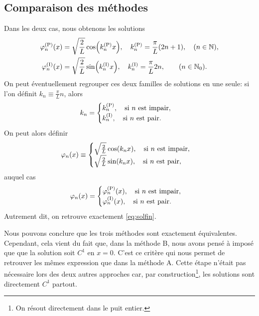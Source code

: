 \documentclass[11pt,a4paper,oneside]{article}
\begin{document}
\subsection{Comparaison des méthodes}

    Dans les deux cas, nous obtenons les solutions
    \begin{align}
        \varphi_n^{(\text{P})}(x) &= \sqrt{\frac{2}{L}}\cos(k^{(\text{P})}_nx),\quad k^{(\text{P})}_n=\frac{\pi}{L}(2n+1),\quad (n\in\mathbb{N}),\label{eq:solf1}\\
        \varphi_n^{(\text{I})}(x) &= \sqrt{\frac{2}{L}}\sin(k^{(\text{I})}_nx), \quad k^{(\text{I})}_n = \frac{\pi}{L}2n, \qquad (n\in\mathbb{N}_0).\label{eq:solf2}
    \end{align}
    On peut éventuellement regrouper ces deux familles de solutions en une seule: si l'on définit $k_n\equiv\frac{\pi}{L}n$, alors
    \begin{equation}
        k_n=
        \begin{cases}
            k^{(\text{P})}_n ,\quad \text{si $n$ est impair},\\
            k^{(\text{I})}_n ,\quad \text{si $n$ est pair}.
        \end{cases}
    \end{equation}
    On peut alors définir
    \begin{equation}
        \varphi_n(x) \equiv
        \begin{cases}
            \sqrt{\frac{2}{L}}\cos(k_nx),\quad \text{si $n$ est impair},\\
            \sqrt{\frac{2}{L}}\sin(k_nx),\quad \text{si $n$ est pair},
        \end{cases}
    \end{equation}
    auquel cas
    \begin{equation}
        \varphi_n(x)=
        \begin{cases}
            \varphi_n^{(\text{P})}(x),\quad \text{si $n$ est impair},\\
            \varphi_n^{(\text{I})}(x),\quad \text{si $n$ est pair}.
        \end{cases}
    \end{equation}
    Autrement dit, on retrouve exactement \eqref{eq:solfin}.

    Nous pouvons conclure que les trois méthodes sont exactement équivalentes. Cependant, cela vient du fait que, dans la méthode B, nous avons pensé à imposé que que la solution soit $C^1$ en $x=0$. C'est ce critère qui nous permet de retrouver les mêmes expression que dans la méthode A. Cette étape n'était pas nécessaire lors des deux autres approches car, par construction\footnote{On résout directement dans le puit entier.}, les solutions sont directement $C^1$ partout.
\end{document}
